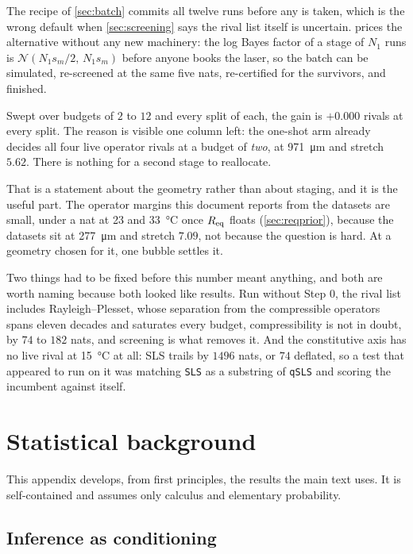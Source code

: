 \documentclass[10pt]{article}
\begin{document}
The recipe of \cref{sec:batch} commits all twelve runs before any is taken, which is the wrong
default when
\cref{sec:screening} says the rival list itself is uncertain.  prices the
alternative without any new machinery: the log Bayes factor of a stage of $N_1$ runs is
$\mathcal{N}(N_1 s_m/2,\, N_1 s_m)$ before anyone books the laser, so the batch can be simulated,
re-screened at the same five nats, re-certified for the survivors, and finished.

Swept over budgets of $2$ to $12$ and every split of each, the gain is $+0.000$ rivals at every
split. The reason is visible one column left: the one-shot arm already decides all four live
operator rivals at a budget of \emph{two}, at \SI{971}{\micro\metre} and stretch $5.62$. There is
nothing for a second stage to reallocate.

That is a statement about the geometry rather than about staging, and it is the useful part. The
operator margins this document reports from the datasets are small, under a nat at
\SI{23}{} and \SI{33}{\celsius} once $R_{\rm eq}$ floats (\cref{sec:reqprior}), because the
datasets sit at \SI{277}{\micro\metre} and stretch $7.09$, not because the question is hard. At a
geometry chosen for it, one bubble settles it.

Two things had to be fixed before this number meant anything, and both are worth naming because
both looked like results. Run without Step $0$, the rival list includes Rayleigh--Plesset, whose
separation from the compressible operators spans eleven decades and saturates every budget, compressibility is not in doubt, by $74$ to $182$ nats, and screening is what removes it. And the
constitutive axis has no live rival at \SI{15}{\celsius} at all: SLS trails by $1496$ nats, or
$74$ deflated, so a test that appeared to run on it was matching \texttt{SLS} as a substring of
\texttt{qSLS} and scoring the incumbent against itself.

\section{Statistical background}
\label{app:background}

This appendix develops, from first principles, the results the main text uses. It is
self-contained and assumes only calculus and elementary probability.

\subsection{Inference as conditioning}
\end{document}
